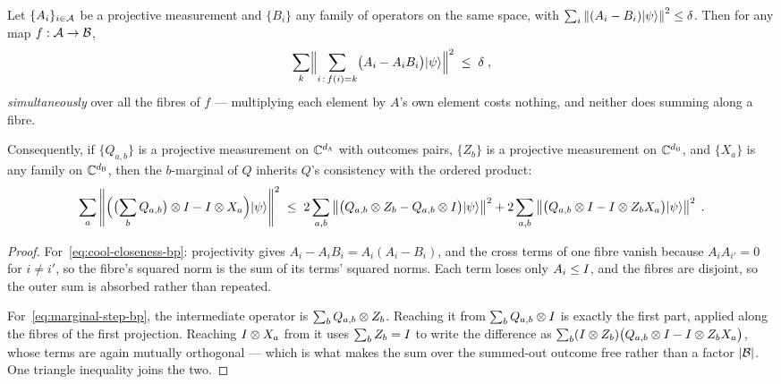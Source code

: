 \begin{lemma}
\label{lem:cool-closeness-fact}
\leanok
Let $\{A_i\}_{i \in \mathcal{A}}$ be a projective measurement and $\{B_i\}$ any family of
operators on the same space, with
$\sum_i \left\| {(A_i - B_i)|\psi\rangle} \right\|^2 \leq \delta$. Then for any map $f : \mathcal{A} \to \mathcal{B}$,
\begin{equation}
  \label{eq:cool-closeness-bp}
  \sum_{k} \Bigl\| \sum_{i \,:\, f(i) = k} \bigl( A_i - A_i B_i \bigr) |\psi\rangle \Bigr\|^2
    \;\leq\; \delta\;,
\end{equation}
\emph{simultaneously} over all the fibres of $f$ --- multiplying each element by $A$'s own element
costs nothing, and neither does summing along a fibre.

Consequently, if $\{Q_{a,b}\}$ is a projective measurement on $\mathbb{C}^{d_{\textsc{A}}}$ with outcomes pairs,
$\{Z_b\}$ is a projective measurement on $\mathbb{C}^{d_{\textsc{B}}}$, and $\{X_a\}$ is any family on
$\mathbb{C}^{d_{\textsc{B}}}$, then the $b$-marginal of $Q$ inherits $Q$'s consistency with the ordered product:
\begin{equation}
  \label{eq:marginal-step-bp}
  \sum_a \left\| {\Bigl( \bigl(\sum_b Q_{a,b}\bigr) \otimes I - I \otimes X_a \Bigr)
      |\psi\rangle} \right\|^2
    \;\leq\; 2 \sum_{a, b} \left\| {\bigl( Q_{a,b} \otimes Z_b - Q_{a,b} \otimes I \bigr)|\psi\rangle} \right\|^2
      + 2 \sum_{a, b} \left\| {\bigl( Q_{a,b} \otimes I - I \otimes Z_b X_a \bigr)|\psi\rangle} \right\|^2\;.
\end{equation}
\end{lemma}

\begin{proof}
\leanok
{}
For~\eqref{eq:cool-closeness-bp}: projectivity gives $A_i - A_i B_i = A_i (A_i - B_i)$, and the
cross terms of one fibre vanish because $A_i A_{i'} = 0$ for $i \neq i'$, so the fibre's squared
norm is the sum of its terms' squared norms. Each term loses only $A_i \leq I$, and the fibres
are disjoint, so the outer sum is absorbed rather than repeated.

For~\eqref{eq:marginal-step-bp}, the intermediate operator is
$\sum_b Q_{a,b} \otimes Z_b$. Reaching it from $\sum_b Q_{a,b} \otimes I$ is exactly the first part,
applied along the fibres of the first projection. Reaching $I \otimes X_a$ from it uses
$\sum_b Z_b = I$ to write the difference as
$\sum_b (I \otimes Z_b)\bigl( Q_{a,b} \otimes I - I \otimes Z_b X_a \bigr)$, whose terms are again
mutually orthogonal --- which is what makes the sum over the summed-out outcome free rather than a
factor $|\mathcal{B}|$. One triangle inequality joins the two.
\end{proof}

